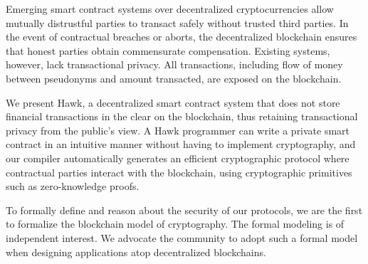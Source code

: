Emerging smart contract systems over decentralized
cryptocurrencies allow mutually distrustful parties to transact
safely without trusted third parties. In the event of contractual breaches or aborts, the decentralized blockchain ensures
that honest parties obtain commensurate compensation. Existing
systems, however, lack transactional privacy. All transactions,
including flow of money between pseudonyms and amount
transacted, are exposed on the blockchain.

We present Hawk, a decentralized smart contract system that
does not store financial transactions in the clear on the blockchain, thus retaining transactional privacy from the public’s view.
A Hawk programmer can write a private smart contract in an
intuitive manner without having to implement cryptography, and
our compiler automatically generates an efficient cryptographic
protocol where contractual parties interact with the blockchain,
using cryptographic primitives such as zero-knowledge proofs.

To formally define and reason about the security of our
protocols, we are the first to formalize the blockchain model
of cryptography. The formal modeling is of independent interest.
We advocate the community to adopt such a formal model when
designing applications atop decentralized blockchains.